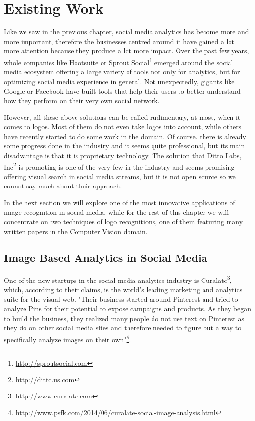 \chapter{Existing Work}

Like we saw in the previous chapter, social media analytics has become more
and more important, therefore the businesses centred around it have gained a
lot more attention because they produce a lot more impact. Over the past few
years, whole companies like Hootsuite or Sprout
Social\footnote{\url{http://sproutsocial.com}} emerged around the social
media ecosystem offering a large variety of tools not only for analytics, but
for optimizing social media experience in general. Not unexpectedly, gigants
like Google or Facebook have built tools that help their users to better
understand how they perform on their very own social network.

However, all these above solutions can be called rudimentary, at most, when it
comes to logos. Most of them do not even take logos into account, while others
have recently started to do some work in the domain. Of course, there is
already some progress done in the industry and it seems quite professional,
but its main disadvantage is that it is proprietary technology. The solution
that Ditto Labs, Inc\footnote{\url{http://ditto.us.com}} is promoting is one
of the very few in the industry and seems promising offering visual search in
social media streams, but it is not open source so we cannot say much about
their approach.

In the next section we will explore one of the most innovative applications of
image recognition in social media, while for the rest of this chapter we will
concentrate on two techniques of logo recognitions, one of them featuring many
written papers in the Computer Vision domain.

\section{Image Based Analytics in Social Media}

One of the new startups in the social media analytics industry is
Curalate\footnote{\url{http://www.curalate.com}}, which, according to their
claims, is the world's leading marketing and analytics suite for the visual
web. "Their business started around Pinterest and tried to analyze Pins for
their potential to expose campaigns and products. As they began to build the
business, they realized many people do not use text on Pinterest as they do on
other social media sites and therefore needed to figure out a way to
specifically analyze images on their
own"\footnote{\url{http://www.psfk.com/2014/06/curalate-social-image-analysis.html}}.

